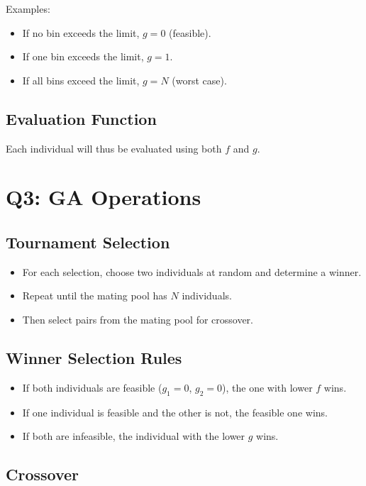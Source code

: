 \documentclass[journal,12pt,onecolumn]{IEEEtran}
\begin{document}
Examples:
\begin{itemize}
    \item If no bin exceeds the limit, $g = 0$ (feasible).
    \item If one bin exceeds the limit, $g = 1$.
    \item If all bins exceed the limit, $g = N$ (worst case).
\end{itemize}

\subsection{Evaluation Function}

Each individual will thus be evaluated using both $f$ and $g$.

\section{Q3: GA Operations}

\subsection{Tournament Selection}

\begin{itemize}
    \item For each selection, choose two individuals at random and determine a winner.
    \item Repeat until the mating pool has $N$ individuals.
    \item Then select pairs from the mating pool for crossover.
\end{itemize}

\subsection{Winner Selection Rules}

\begin{itemize}
    \item If both individuals are feasible ($g_1 = 0$, $g_2 = 0$), the one with lower $f$ wins.
    \item If one individual is feasible and the other is not, the feasible one wins.
    \item If both are infeasible, the individual with the lower $g$ wins.
\end{itemize}

\subsection{Crossover}
\end{document}
